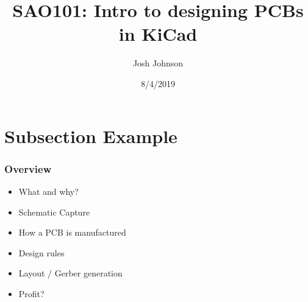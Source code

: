 \documentclass[t]{beamer}
\title[SAO101]{SAO101: Intro to designing PCBs in KiCad} %
\author{Josh Johnson} %
\institute[] %
{ \\ %
\medskip
\textit{} %
}
\date{8/4/2019} %
\begin{document}
\begin{frame}
\titlepage %
\end{frame}


\section{Subsection Example} %

\begin{frame}
\frametitle{Overview}
\begin{itemize}
\item What and why?
\item Schematic Capture
\item How a PCB is manufactured
\item Design rules
\item Layout / Gerber generation
\item Profit?
\end{itemize}
\end{frame}

\end{document}
